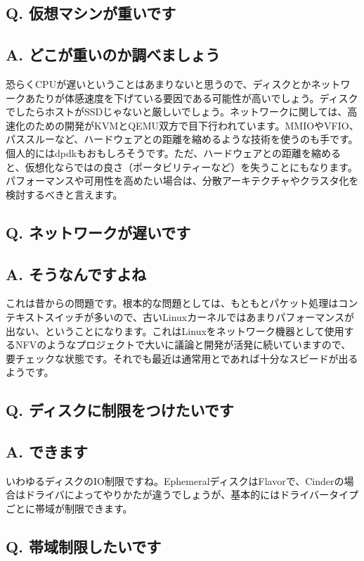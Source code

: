 \documentclass[9pt,b5paper,tombo,openany]{jsbook}
\begin{document}
\subsection*{{\LARGE\bfseries Q.} 仮想マシンが重いです}
\subsection*{{\LARGE\bfseries A.} どこが重いのか調べましょう}
恐らくCPUが遅いということはあまりないと思うので、ディスクとかネットワークあたりが体感速度を下げている要因である可能性が高いでしょう。ディスクでしたらホストがSSDじゃないと厳しいでしょう。ネットワークに関しては、高速化のための開発がKVMとQEMU双方で目下行われています。MMIOやVFIO、パススルーなど、ハードウェアとの距離を縮めるような技術を使うのも手です。個人的にはdpdkもおもしろそうです。ただ、ハードウェアとの距離を縮めると、仮想化ならではの良さ（ポータビリティーなど）を失うことにもなります。パフォーマンスや可用性を高めたい場合は、分散アーキテクチャやクラスタ化を検討するべきと言えます。

\subsection*{{\LARGE\bfseries Q.} ネットワークが遅いです}
\subsection*{{\LARGE\bfseries A.} そうなんですよね}
これは昔からの問題です。根本的な問題としては、もともとパケット処理はコンテキストスイッチが多いので、古いLinuxカーネルではあまりパフォーマンスが出ない、ということになります。これはLinuxをネットワーク機器として使用するNFVのようなプロジェクトで大いに議論と開発が活発に続いていますので、要チェックな状態です。それでも最近は通常用とであれば十分なスピードが出るようです。

\subsection*{{\LARGE\bfseries Q.} ディスクに制限をつけたいです}
\subsection*{{\LARGE\bfseries A.} できます}
いわゆるディスクのIO制限ですね。EphemeralディスクはFlavorで、Cinderの場合はドライバによってやりかたが違うでしょうが、基本的にはドライバータイプごとに帯域が制限できます。

\subsection*{{\LARGE\bfseries Q.} 帯域制限したいです}
\end{document}
